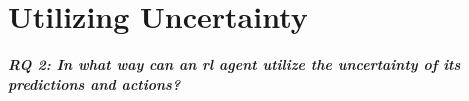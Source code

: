 \chapter{Utilizing Uncertainty}
\begin{center} 
\textit{\textbf{RQ 2: In what way can an \gls{rl} agent utilize the uncertainty of its predictions and actions?}}
\end{center}
\vspace{12pt}
